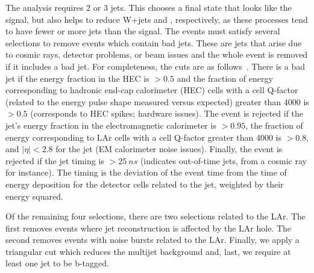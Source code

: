 The analysis requires 2 or 3 jets.  This chooses a final state that looks like the signal, but also helps to reduce W+jets and \ttbar, respectively, as these processes tend to have fewer or more jets than the signal.   The events must satisfy several selections to remove events which contain bad jets.  These are jets that arise due to cosmic rays, detector problems, or beam issues and the whole event is removed if it includes a bad jet.  For completeness, the cuts are as follows~\cite{BadJet, BadJet2}.  There is a bad jet if the energy fraction in the HEC is $> 0.5$ and the fraction of energy corresponding to hadronic end-cap calorimeter (HEC) cells with a cell Q-factor (related to the energy pulse shape measured versus expected) greater than 4000 is $> 0.5$ (corresponds to HEC spikes; hardware issues).  The event is rejected if the jet's energy fraction in the electromagnetic calorimeter is $> 0.95$, the fraction of energy corresponding to LAr cells with a cell Q-factor greater than 4000 is $> 0.8$, and $|\eta| < 2.8$ for the jet (EM calorimeter noise issues).  Finally, the event is rejected if the jet timing is $> 25~ns$ (indicates out-of-time jets, from a cosmic ray for instance).  The timing is the deviation of the event time from the time of energy deposition for the detector cells related to the jet, weighted by their energy squared.

Of the remaining four selections, there are two selections related to the LAr.  The first removes events where jet reconstruction is affected by the LAr hole.  The second removes events with noise bursts related to the LAr.  Finally, we apply a triangular cut which reduces the multijet background and, last, we require at least one jet to be b-tagged.
